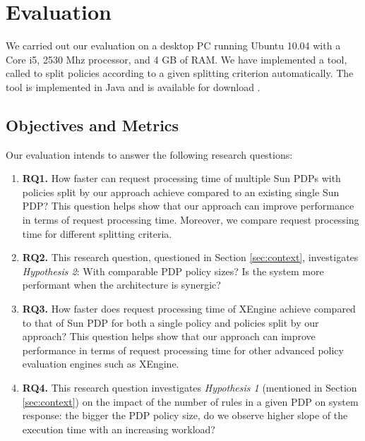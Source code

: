 \section{Evaluation} \label{sec:experiment}
We carried out our evaluation on a desktop PC running Ubuntu 10.04 with a Core i5, 2530 Mhz processor, and 4 GB of RAM. 
We have implemented a tool, called  to split policies according to a given splitting criterion automatically.
The tool is implemented in Java and is available for download \cite{splitter}.

\subsection{Objectives and Metrics}
Our evaluation intends to answer the following research questions:
\begin{enumerate}
\item \textbf{RQ1.} How faster can request processing time of multiple Sun PDPs with policies split by our approach achieve compared
to an existing single Sun PDP? This question helps show that our approach can improve performance in terms of request processing time. 
Moreover, we compare request processing time for different splitting criteria.
\item \textbf{RQ2.} This research question, questioned in Section \ref{sec:context}, investigates \textit{Hypothesis 2}: 
With comparable PDP policy sizes? Is the system more performant when the architecture is synergic?
\item \textbf{RQ3.} How faster does request processing time of XEngine achieve compared
to that of Sun PDP for both a single policy and policies split by our approach?
This question helps show that our approach can improve performance in terms of request processing time for other advanced policy evaluation 
engines such as XEngine.
\item \textbf{RQ4.} This research question investigates \textit{Hypothesis 1} 
(mentioned in Section \ref{sec:context}) on the impact of the number of rules in a given PDP on system response: 
the bigger the PDP policy size, do we observe higher slope of the execution time with an increasing workload? 
\end{enumerate}

